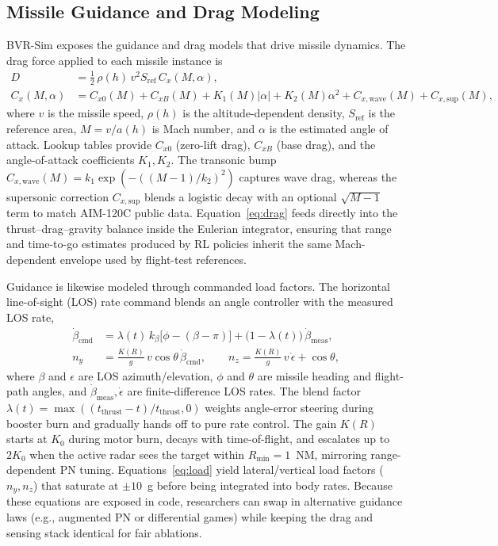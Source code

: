 \documentclass[11pt]{article}
\begin{document}
\subsection{Missile Guidance and Drag Modeling}
BVR-Sim exposes the guidance and drag models that drive missile dynamics. The drag force applied to each missile instance is
\begin{align}
D &= \tfrac{1}{2}\,\rho(h)\,v^{2} S_{\text{ref}}\,C_x(M,\alpha), \label{eq:drag}\\
C_x(M,\alpha) &= C_{x0}(M) + C_{xB}(M) + K_1(M)|\alpha| + K_2(M)\alpha^{2} + C_{x,\text{wave}}(M) + C_{x,\text{sup}}(M), \label{eq:cx}
\end{align}
where $v$ is the missile speed, $\rho(h)$ is the altitude-dependent density, $S_{\text{ref}}$ is the reference area, $M=v/a(h)$ is Mach number, and $\alpha$ is the estimated angle of attack. Lookup tables provide $C_{x0}$ (zero-lift drag), $C_{xB}$ (base drag), and the angle-of-attack coefficients $K_1,K_2$. The transonic bump $C_{x,\text{wave}}(M)=k_1\exp(-((M-1)/k_2)^2)$ captures wave drag, whereas the supersonic correction $C_{x,\text{sup}}$ blends a logistic decay with an optional $\sqrt{M-1}$ term to match AIM-120C public data. Equation~\eqref{eq:drag} feeds directly into the thrust--drag--gravity balance inside the Eulerian integrator, ensuring that range and time-to-go estimates produced by RL policies inherit the same Mach-dependent envelope used by flight-test references.

Guidance is likewise modeled through commanded load factors. The horizontal line-of-sight (LOS) rate command blends an angle controller with the measured LOS rate,
\begin{align}
\dot{\beta}_{\text{cmd}} &= \lambda(t)\,k_\beta\big[\phi - (\beta - \pi)\big] + \big(1-\lambda(t)\big)\,\dot{\beta}_{\text{meas}}, \label{eq:beta_cmd}\\
 n_{y} &= \frac{K(R)}{g}\,v\cos\theta\,\dot{\beta}_{\text{cmd}}, \qquad
 n_{z} = \frac{K(R)}{g}\,v\,\dot{\epsilon} + \cos\theta, \label{eq:load}
\end{align}
where $\beta$ and $\epsilon$ are LOS azimuth/elevation, $\phi$ and $\theta$ are missile heading and flight-path angles, and $\dot{\beta}_{\text{meas}},\dot{\epsilon}$ are finite-difference LOS rates. The blend factor $\lambda(t)=\max((t_{\text{thrust}}-t)/t_{\text{thrust}},0)$ weights angle-error steering during booster burn and gradually hands off to pure rate control. The gain $K(R)$ starts at $K_0$ during motor burn, decays with time-of-flight, and escalates up to $2K_0$ when the active radar sees the target within $R_{\min}=1$~NM, mirroring range-dependent PN tuning. Equations~\eqref{eq:load} yield lateral/vertical load factors ($n_y,n_z$) that saturate at $\pm 10$~g before being integrated into body rates. Because these equations are exposed in code, researchers can swap in alternative guidance laws (e.g., augmented PN or differential games) while keeping the drag and sensing stack identical for fair ablations.
\end{document}
